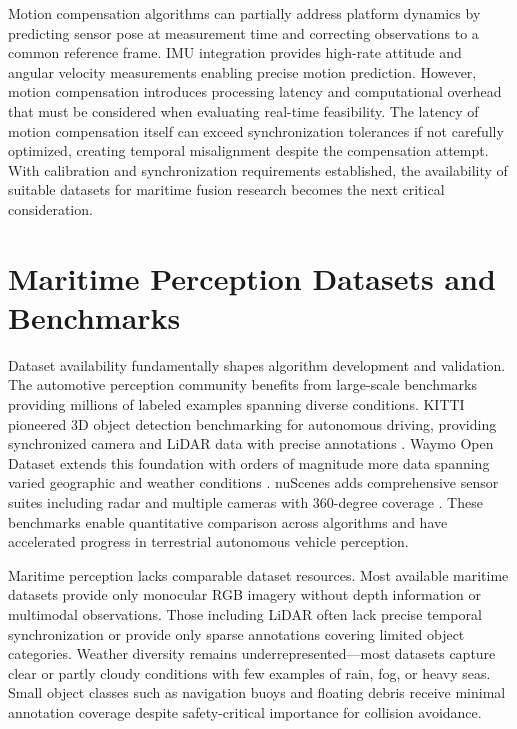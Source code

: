 \documentclass[../main.tex]{subfiles}
\begin{document}
Motion compensation algorithms can partially address platform dynamics by predicting sensor pose at measurement time and correcting observations to a common reference frame. IMU integration provides high-rate attitude and angular velocity measurements enabling precise motion prediction. However, motion compensation introduces processing latency and computational overhead that must be considered when evaluating real-time feasibility. The latency of motion compensation itself can exceed synchronization tolerances if not carefully optimized, creating temporal misalignment despite the compensation attempt. With calibration and synchronization requirements established, the availability of suitable datasets for maritime fusion research becomes the next critical consideration.

\section{Maritime Perception Datasets and Benchmarks}

Dataset availability fundamentally shapes algorithm development and validation. The automotive perception community benefits from large-scale benchmarks providing millions of labeled examples spanning diverse conditions. KITTI pioneered 3D object detection benchmarking for autonomous driving, providing synchronized camera and LiDAR data with precise annotations \cite{geiger2012}. Waymo Open Dataset extends this foundation with orders of magnitude more data spanning varied geographic and weather conditions \cite{su2023}. nuScenes adds comprehensive sensor suites including radar and multiple cameras with 360-degree coverage \cite{feng2021}. These benchmarks enable quantitative comparison across algorithms and have accelerated progress in terrestrial autonomous vehicle perception.

Maritime perception lacks comparable dataset resources. Most available maritime datasets provide only monocular RGB imagery without depth information or multimodal observations. Those including LiDAR often lack precise temporal synchronization or provide only sparse annotations covering limited object categories. Weather diversity remains underrepresented—most datasets capture clear or partly cloudy conditions with few examples of rain, fog, or heavy seas. Small object classes such as navigation buoys and floating debris receive minimal annotation coverage despite safety-critical importance for collision avoidance.
\end{document}

